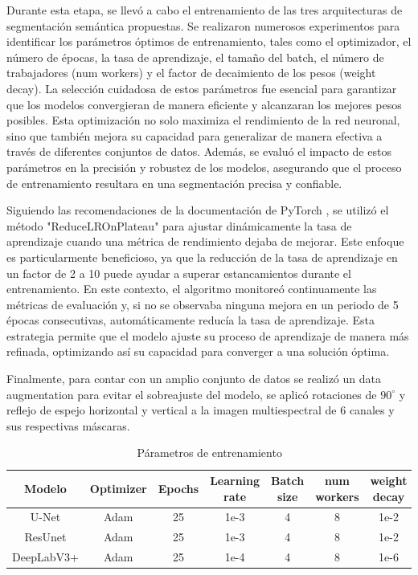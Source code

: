 Durante esta etapa, se llevó a cabo el entrenamiento de las tres arquitecturas de segmentación semántica propuestas. Se realizaron numerosos experimentos para identificar los parámetros óptimos de entrenamiento, tales como el optimizador, el número de épocas, la tasa de aprendizaje, el tamaño del batch, el número de trabajadores (num workers) y el factor de decaimiento de los pesos (weight decay). La selección cuidadosa de estos parámetros fue esencial para garantizar que los modelos convergieran de manera eficiente y alcanzaran los mejores pesos posibles. Esta optimización no solo maximiza el rendimiento de la red neuronal, sino que también mejora su capacidad para generalizar de manera efectiva a través de diferentes conjuntos de datos. Además, se evaluó el impacto de estos parámetros en la precisión y robustez de los modelos, asegurando que el proceso de entrenamiento resultara en una segmentación precisa y confiable.

Siguiendo las recomendaciones de la documentación de PyTorch \parencite{pytorch-lr-scheduler}, se utilizó el método "ReduceLROnPlateau" para ajustar dinámicamente la tasa de aprendizaje cuando una métrica de rendimiento dejaba de mejorar. Este enfoque es particularmente beneficioso, ya que la reducción de la tasa de aprendizaje en un factor de 2 a 10 puede ayudar a superar estancamientos durante el entrenamiento. En este contexto, el algoritmo monitoreó continuamente las métricas de evaluación y, si no se observaba ninguna mejora en un periodo de 5 épocas consecutivas, automáticamente reducía la tasa de aprendizaje. Esta estrategia permite que el modelo ajuste su proceso de aprendizaje de manera más refinada, optimizando así su capacidad para converger a una solución óptima.


Finalmente, para contar con un amplio conjunto de datos se realizó un data augmentation para evitar el sobreajuste del modelo, se aplicó rotaciones de $90^\circ$ y reflejo de espejo horizontal y vertical a la imagen multiespectral de 6 canales y sus respectivas máscaras.
 


\begin{table}[h!]
	\centering
	\begin{tabular}{|c|c|c|c|c|c|c|}
		\hline
		\textbf{Modelo} & \textbf{Optimizer} & \textbf{Epochs} & \textbf{Learning rate} & \textbf{Batch size} & \textbf{num workers} & \textbf{weight decay}\\
		\hline
		U-Net  & Adam & 25 & 1e-3 & 4 & 8 & 1e-2 \\
		ResUnet   & Adam & 25 & 1e-3 & 4 & 8 & 1e-2 \\
		DeepLabV3+ & Adam & 25  & 1e-4 & 4 & 8 & 1e-6 \\
		
		\hline
	\end{tabular}
	\caption{Párametros de entrenamiento}
	\label{tabla2}
\end{table}

